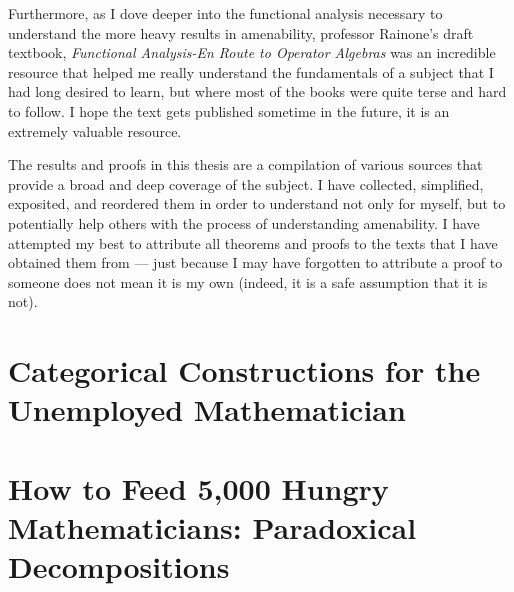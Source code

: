 \documentclass[11pt]{package2}
\begin{document}
Furthermore, as I dove deeper into the functional analysis necessary to understand the more heavy results in amenability, professor Rainone's draft textbook, \textit{Functional Analysis-En Route to Operator Algebras} was an incredible resource that helped me really understand the fundamentals of a subject that I had long desired to learn, but where most of the books were quite terse and hard to follow. I hope the text gets published sometime in the future, it is an extremely valuable resource.\newline

The results and proofs in this thesis are a compilation of various sources that provide a broad and deep coverage of the subject. I have collected, simplified, exposited, and reordered them in order to understand not only for myself, but to potentially help others with the process of understanding amenability. I have attempted my best to attribute all theorems and proofs to the texts that I have obtained them from --- just because I may have forgotten to attribute a proof to someone does not mean it is my own (indeed, it is a safe assumption that it is not).
\chapter{Categorical Constructions for the Unemployed Mathematician}\label{ch:categorical_constructions}

\chapter{How to Feed 5,000 Hungry Mathematicians: Paradoxical Decompositions}\label{ch:paradoxical_decompositions}

\end{document}
